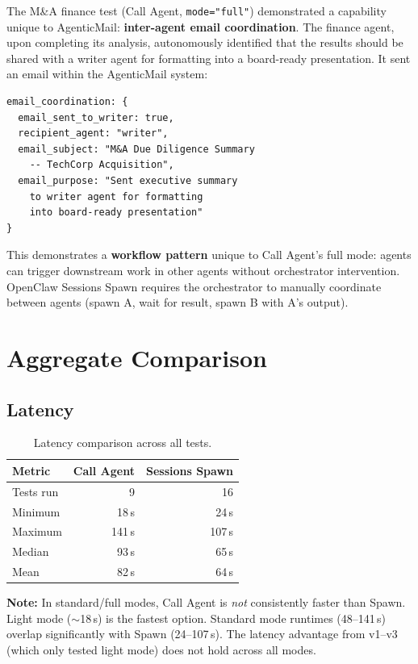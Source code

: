 \documentclass[11pt,twocolumn]{article}
\begin{document}
The M\&A finance test (Call Agent, \texttt{mode="full"}) demonstrated a capability unique to AgenticMail: \textbf{inter-agent email coordination}. The finance agent, upon completing its analysis, autonomously identified that the results should be shared with a writer agent for formatting into a board-ready presentation. It sent an email within the AgenticMail system:

\begin{lstlisting}
email_coordination: {
  email_sent_to_writer: true,
  recipient_agent: "writer",
  email_subject: "M&A Due Diligence Summary
    -- TechCorp Acquisition",
  email_purpose: "Sent executive summary
    to writer agent for formatting
    into board-ready presentation"
}
\end{lstlisting}

This demonstrates a \textbf{workflow pattern} unique to Call Agent's full mode: agents can trigger downstream work in other agents without orchestrator intervention. OpenClaw Sessions Spawn requires the orchestrator to manually coordinate between agents (spawn A, wait for result, spawn B with A's output).

\section{Aggregate Comparison}

\subsection{Latency}

\begin{table}[H]
\centering
\caption{Latency comparison across all tests.}
\begin{tabular}{@{}lrr@{}}
\toprule
\textbf{Metric} & \textbf{Call Agent} & \textbf{Sessions Spawn} \\
\midrule
Tests run & 9 & 16 \\
Minimum & 18\,s & 24\,s \\
Maximum & 141\,s & 107\,s \\
Median & 93\,s & 65\,s \\
Mean & 82\,s & 64\,s \\
\bottomrule
\end{tabular}
\end{table}

\textbf{Note:} In standard/full modes, Call Agent is \emph{not} consistently faster than Spawn. Light mode ($\sim$18\,s) is the fastest option. Standard mode runtimes (48--141\,s) overlap significantly with Spawn (24--107\,s). The latency advantage from v1--v3 (which only tested light mode) does not hold across all modes.
\end{document}
